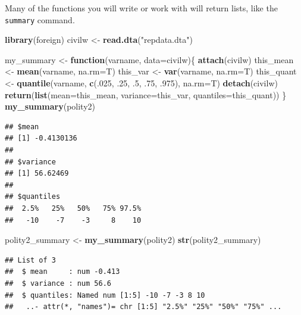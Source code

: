 \documentclass[]{article}
\newenvironment{Shaded}{\begin{snugshade}}{\end{snugshade}}
\newcommand{\KeywordTok}[1]{\textcolor[rgb]{0.13,0.29,0.53}{\textbf{#1}}}
\newcommand{\DataTypeTok}[1]{\textcolor[rgb]{0.13,0.29,0.53}{#1}}
\newcommand{\DecValTok}[1]{\textcolor[rgb]{0.00,0.00,0.81}{#1}}
\newcommand{\StringTok}[1]{\textcolor[rgb]{0.31,0.60,0.02}{#1}}
\newcommand{\ControlFlowTok}[1]{\textcolor[rgb]{0.13,0.29,0.53}{\textbf{#1}}}
\newcommand{\NormalTok}[1]{#1}
\begin{document}
Many of the functions you will write or work with will return lists,
like the \texttt{summary} command.

\begin{Shaded}
\begin{Highlighting}[]
\KeywordTok{library}\NormalTok{(foreign)}
\NormalTok{civilw <-}\StringTok{ }\KeywordTok{read.dta}\NormalTok{(}\StringTok{"repdata.dta"}\NormalTok{)}


\NormalTok{my_summary <-}\StringTok{ }\ControlFlowTok{function}\NormalTok{(varname, }\DataTypeTok{data=}\NormalTok{civilw)\{}
  \KeywordTok{attach}\NormalTok{(civilw)}
\NormalTok{  this_mean <-}\StringTok{ }\KeywordTok{mean}\NormalTok{(varname, }\DataTypeTok{na.rm=}\NormalTok{T)}
\NormalTok{  this_var <-}\StringTok{ }\KeywordTok{var}\NormalTok{(varname, }\DataTypeTok{na.rm=}\NormalTok{T)}
\NormalTok{  this_quant <-}\StringTok{ }\KeywordTok{quantile}\NormalTok{(varname, }\KeywordTok{c}\NormalTok{(.}\DecValTok{025}\NormalTok{, .}\DecValTok{25}\NormalTok{, .}\DecValTok{5}\NormalTok{, .}\DecValTok{75}\NormalTok{, .}\DecValTok{975}\NormalTok{), }\DataTypeTok{na.rm=}\NormalTok{T)}
  \KeywordTok{detach}\NormalTok{(civilw)}
  \KeywordTok{return}\NormalTok{(}\KeywordTok{list}\NormalTok{(}\DataTypeTok{mean=}\NormalTok{this_mean, }\DataTypeTok{variance=}\NormalTok{this_var, }\DataTypeTok{quantiles=}\NormalTok{this_quant))}
\NormalTok{\}}
\KeywordTok{my_summary}\NormalTok{(polity2)}
\end{Highlighting}
\end{Shaded}

\begin{verbatim}
## $mean
## [1] -0.4130136
## 
## $variance
## [1] 56.62469
## 
## $quantiles
##  2.5%   25%   50%   75% 97.5% 
##   -10    -7    -3     8    10
\end{verbatim}

\begin{Shaded}
\begin{Highlighting}[]
\NormalTok{polity2_summary <-}\StringTok{ }\KeywordTok{my_summary}\NormalTok{(polity2)}
\KeywordTok{str}\NormalTok{(polity2_summary)}
\end{Highlighting}
\end{Shaded}

\begin{verbatim}
## List of 3
##  $ mean     : num -0.413
##  $ variance : num 56.6
##  $ quantiles: Named num [1:5] -10 -7 -3 8 10
##   ..- attr(*, "names")= chr [1:5] "2.5%" "25%" "50%" "75%" ...
\end{verbatim}
\end{document}

